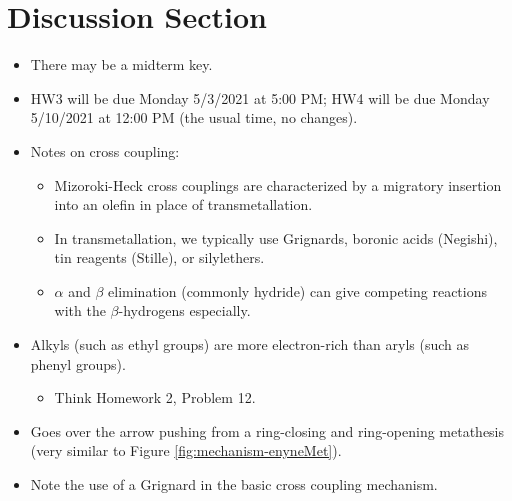 \documentclass[../notes.tex]{subfiles}
\begin{document}
\section{Discussion Section}
\begin{itemize}
    \item {}There may be a midterm key.
    \item HW3 will be due Monday 5/3/2021 at 5:00 PM; HW4 will be due Monday 5/10/2021 at 12:00 PM (the usual time, no changes).
    \item Notes on cross coupling:
    \begin{itemize}
        \item Mizoroki-Heck cross couplings are characterized by a migratory insertion into an olefin in place of transmetallation.
        \item In transmetallation, we typically use Grignards, boronic acids (Negishi), tin reagents (Stille), or silylethers.
        \item $\alpha$ and $\beta$ elimination (commonly hydride) can give competing reactions with the $\beta$-hydrogens especially.
    \end{itemize}
    \item Alkyls (such as ethyl groups) are more electron-rich than aryls (such as phenyl groups).
    \begin{itemize}
        \item Think Homework 2, Problem 12.
    \end{itemize}
    \item Goes over the arrow pushing from a ring-closing and ring-opening metathesis (very similar to Figure \ref{fig:mechanism-enyneMet}).
    \item Note the use of a Grignard in the basic cross coupling mechanism.
\end{itemize}
\end{document}
